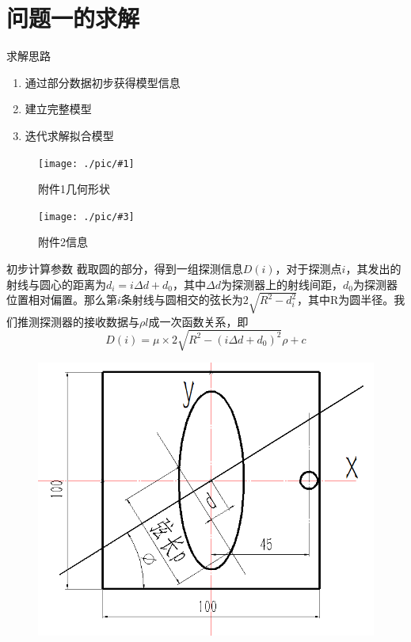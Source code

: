 \documentclass{beamer} %
\newcommand{\doublepic}[4]{ \begin{figure}[H]
\begin{minipage}[H]{0.45\textwidth}
\centering
\texttt{[image: ./pic/\#1]}
\caption{#2}
\end{minipage}
\begin{minipage}[H]{0.45\textwidth}
\centering
\texttt{[image: ./pic/\#3]}
\caption{#4}
\end{minipage}
\end{figure}}
\begin{document}
\section{问题一的求解}

\begin{frame}{求解思路}
	\begin{enumerate}
		\item 通过部分数据初步获得模型信息
		\item 建立完整模型
		\item 迭代求解拟合模型
	\end{enumerate}
	\doublepic{fujian1.png}{附件1几何形状}{fujian2.png}{附件2信息}
\end{frame}

\begin{frame}{初步计算参数}
	\small 截取圆的部分，得到一组探测信息\(D(i)\)，对于探测点\(i\)，其发出的射线与圆心的距离为\(d_i = i\Delta d + d_0\)，其中\(\Delta d\)为探测器上的射线间距，\(d_0\)为探测器位置相对偏置。那么第\(i\)条射线与圆相交的弦长为\(2\sqrt{R^2 - d_i^2}\)，其中R为圆半径。我们推测探测器的接收数据与\(\rho l\)成一次函数关系，即
	\begin{equation}
		D(i)  = \mu\times 2\sqrt{R^2 - ( i\Delta d + d_0)^2}\rho  +c
	\end{equation}
	\begin{figure}[H]
		\begin{minipage}[H]{0.45\textwidth}
		\centering
		\includegraphics[width=\textwidth]{./pic/q10.png}
		\end{minipage}
		\begin{minipage}[H]{0.45\textwidth}

\end{minipage}
\end{figure}
\end{frame}
\end{document}
